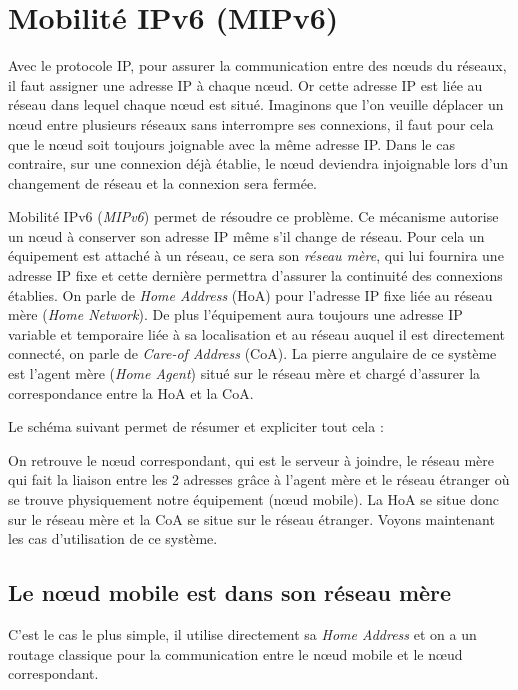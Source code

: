 \section{Mobilité IPv6 (MIPv6)}

Avec le protocole IP, pour assurer la communication entre des nœuds du réseaux, il faut assigner une adresse IP à chaque nœud.
Or cette adresse IP est liée au réseau dans lequel chaque nœud est situé.
Imaginons que l'on veuille déplacer un nœud entre plusieurs réseaux sans interrompre ses connexions, il faut pour cela que le nœud soit toujours joignable avec la même adresse IP.
Dans le cas contraire, sur une connexion déjà établie, le nœud deviendra injoignable lors d'un changement de réseau et la connexion sera fermée.

Mobilité IPv6 (\textit{MIPv6}) permet de résoudre ce problème.
Ce mécanisme autorise un nœud à conserver son adresse IP même s'il change de réseau.
Pour cela un équipement est attaché à un réseau, ce sera son \emph{réseau mère}, qui lui fournira une adresse IP fixe et cette dernière permettra d’assurer la continuité des connexions établies.
On parle de \emph{Home Address} (HoA) pour l’adresse IP fixe liée au réseau mère (\emph{Home Network}).
De plus l’équipement aura toujours une adresse IP variable et temporaire liée à sa localisation et au réseau auquel il est directement connecté, on parle de \emph{Care-of Address} (CoA).
La pierre angulaire de ce système est l’agent mère (\emph{Home Agent}) situé sur le réseau mère et chargé d’assurer la correspondance entre la HoA et la CoA.

Le schéma suivant permet de résumer et expliciter tout cela :


On retrouve le nœud correspondant, qui est le serveur à joindre, le réseau mère qui fait la liaison entre les 2 adresses grâce à l'agent mère et le réseau étranger où se trouve physiquement notre équipement (nœud mobile).
La HoA se situe donc sur le réseau mère et la CoA se situe sur le réseau étranger.
Voyons maintenant les cas d’utilisation de ce système.

\subsection{Le nœud mobile est dans son réseau mère}

C’est le cas le plus simple, il utilise directement sa \emph{Home Address} et on a un routage classique pour la communication entre le nœud mobile et le nœud correspondant.

